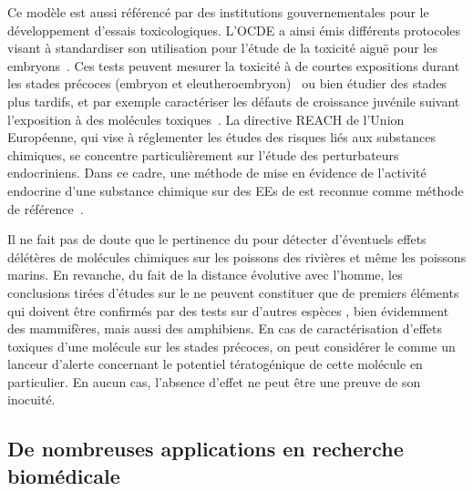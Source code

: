 \documentclass[\main/main.tex]{subfiles}
\begin{document}
%
Ce modèle est aussi référencé par des institutions gouvernementales pour le développement d'essais toxicologiques.
%
L'OCDE a ainsi émis différents protocoles visant à standardiser son utilisation pour l'étude de la toxicité aiguë pour les embryons~\cite{oecd_2013}. Ces tests peuvent mesurer la toxicité à de courtes expositions durant les stades précoces (embryon et eleutheroembryon)~\cite{oecd_2013a} ou bien étudier  des stades plus tardifs, et par exemple caractériser les défauts de croissance juvénile suivant l'exposition à des molécules toxiques~\cite{oecd_2000}.
%
La directive REACH de l'Union Européenne, qui vise à réglementer les études des risques liés aux substances chimiques, se concentre particulièrement sur l'étude des perturbateurs endocriniens.
%
Dans ce cadre, une méthode de mise en évidence de l'activité endocrine d'une substance chimique sur des EEs de \pz{} est reconnue comme méthode de référence~\cite{europeanchemicalagencyechaandeuropeanfoodsafetyauthorityefsawiththetechnicalsupportofthejointresearchcentrejrc_2018}.

Il ne fait pas de doute que le  pertinence du \pz{} pour détecter d'éventuels effets délétères de molécules chimiques sur les poissons des rivières et même les poissons marins. En revanche, du fait de la distance évolutive avec l'homme, les conclusions tirées d'études sur le \pz{} ne peuvent constituer que de premiers éléments  qui doivent être confirmés par des tests sur d'autres espèces , bien évidemment des mammifères, mais aussi des amphibiens. En cas de caractérisation d'effets toxiques d'une molécule sur les stades précoces, on peut considérer le \pz{} comme un lanceur d'alerte concernant le potentiel tératogénique de cette molécule en particulier. En aucun cas, l'absence d'effet ne peut être une preuve de son inocuité. 
%

    \subsection{De nombreuses applications en recherche biomédicale}
\end{document}
